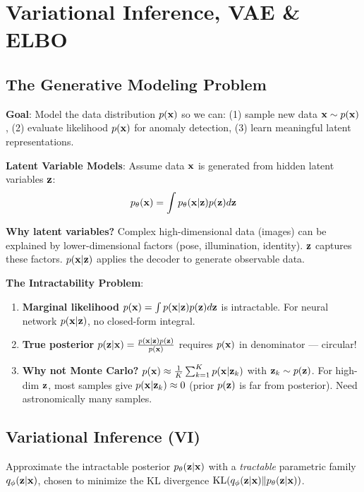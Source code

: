 \section{Variational Inference, VAE \& ELBO}

\subsection{The Generative Modeling Problem}
\textbf{Goal}: Model the data distribution $p(\mathbf{x})$ so we can: (1) sample new data $\mathbf{x} \sim p(\mathbf{x})$, (2) evaluate likelihood $p(\mathbf{x})$ for anomaly detection, (3) learn meaningful latent representations.

\textbf{Latent Variable Models}: Assume data $\mathbf{x}$ is generated from hidden latent variables $\mathbf{z}$:
$$p_\theta(\mathbf{x}) = \int p_\theta(\mathbf{x}|\mathbf{z})p(\mathbf{z})d\mathbf{z}$$

\textbf{Why latent variables?} Complex high-dimensional data (images) can be explained by lower-dimensional factors (pose, illumination, identity). $\mathbf{z}$ captures these factors. $p(\mathbf{x}|\mathbf{z})$ applies the decoder to generate observable data.

\textbf{The Intractability Problem}:
\begin{enumerate}
\item \textbf{Marginal likelihood} $p(\mathbf{x}) = \int p(\mathbf{x}|\mathbf{z})p(\mathbf{z})d\mathbf{z}$ is intractable. For neural network $p(\mathbf{x}|\mathbf{z})$, no closed-form integral.
\item \textbf{True posterior} $p(\mathbf{z}|\mathbf{x}) = \frac{p(\mathbf{x}|\mathbf{z})p(\mathbf{z})}{p(\mathbf{x})}$ requires $p(\mathbf{x})$ in denominator — circular!
\item \textbf{Why not Monte Carlo?} $p(\mathbf{x}) \approx \frac{1}{K}\sum_{k=1}^K p(\mathbf{x}|\mathbf{z}_k)$ with $\mathbf{z}_k \sim p(\mathbf{z})$. For high-dim $\mathbf{z}$, most samples give $p(\mathbf{x}|\mathbf{z}_k) \approx 0$ (prior $p(\mathbf{z})$ is far from posterior). Need astronomically many samples.
\end{enumerate}

\subsection{Variational Inference (VI)}
\begin{definition}
Approximate the intractable posterior $p_\theta(\mathbf{z}|\mathbf{x})$ with a \emph{tractable} parametric family $q_\phi(\mathbf{z}|\mathbf{x})$, chosen to minimize the KL divergence $\text{KL}(q_\phi(\mathbf{z}|\mathbf{x}) \| p_\theta(\mathbf{z}|\mathbf{x}))$.
\end{definition}

